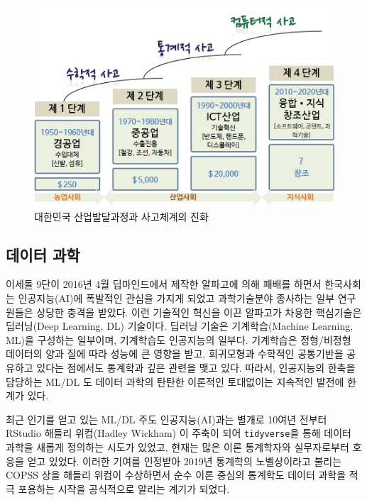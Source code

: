 \documentclass[smallextended]{svjour3}       %
\begin{document}
\begin{figure}

{\centering \includegraphics[width=1\linewidth]{fig/korea-development-stages} 

}

\caption{대한민국 산업발달과정과 사고체계의 진화}\label{fig:paradigm-development}
\end{figure}

\hypertarget{uxb370uxc774uxd130-uxacfcuxd559}{%
\subsection{데이터 과학}\label{uxb370uxc774uxd130-uxacfcuxd559}}

이세돌 9단이 2016년 4월 딥마인드에서 제작한 알파고에 의해 패배를 하면서
한국사회는 인공지능(AI)에 폭발적인 관심을 가지게 되었고 과학기술분야
종사하는 일부 연구원들은 상당한 충격을 받았다. 이런 기술적인 혁신을 이끈
알파고가 차용한 핵심기술은 딥러닝(Deep Learning, DL) 기술이다. 딥러닝
기술은 기계학습(Machine Learning, ML)을 구성하는 일부이며, 기계학습도
인공지능의 일부다. 기계학습은 정형/비정형 데이터의 양과 질에 따라 성능에
큰 영향을 받고, 회귀모형과 수학적인 공통기반을 공유하고 있다는 점에서도
통계학과 깊은 관련을 맺고 있다. 따라서, 인공지능의 한축을 담당하는 ML/DL
도 데이터 과학의 탄탄한 이론적인 토대없이는 지속적인 발전에 한계가 있다.

최근 인기를 얻고 있는 ML/DL 주도 인공지능(AI)과는 별개로 10여년 전부터
RStudio 해들리 위컴(Hadley Wickham) 이 주축이 되어 \texttt{tidyverse}을
통해 데이터 과학을 새롭게 정의하는 시도가 있었고, 현재는 많은 이론
통계학자와 실무자로부터 호응을 얻고 있었다. 이러한 기여를 인정받아
2019년 통계학의 노벨상이라고 불리는 COPSS 상을 해들리 위컴이 수상하면서
순수 이론 중심의 통계학도 데이터 과학을 적극 포용하는 시작을 공식적으로
알리는 계기가 되었다.
\end{document}
